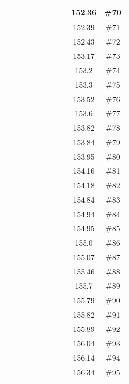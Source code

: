 \begin{center}
\begin{longtable}{|c|c|c|c|c|c|c|c|c|c|}
 \x &  \x &  &  &  &  \x &  \x &  & 152.36 & \#70 \\ \hline
 \x &  \x &  \x &  \x &  \x &  &  \x &  \x & 152.39 & \#71 \\ \hline
 \x &  &  &  \x &  \x &  \x &  &  \x & 152.43 & \#72 \\ \hline
 \x &  \x &  &  &  \x &  \x &  &  & 153.17 & \#73 \\ \hline
 \x &  \x &  \x &  &  &  &  \x &  & 153.2 & \#74 \\ \hline
 \x &  &  \x &  \x &  \x &  &  \x &  \x & 153.3 & \#75 \\ \hline
 \x &  &  \x &  \x &  &  &  \x &  & 153.52 & \#76 \\ \hline
 \x &  &  &  \x &  &  &  &  & 153.6 & \#77 \\ \hline
 \x &  \x &  \x &  &  &  \x &  \x &  & 153.82 & \#78 \\ \hline
 \x &  &  \x &  \x &  \x &  &  &  & 153.84 & \#79 \\ \hline
 \x &  &  &  &  \x &  \x &  &  & 153.95 & \#80 \\ \hline
 \x &  &  \x &  &  \x &  &  &  & 154.16 & \#81 \\ \hline
 \x &  \x &  &  \x &  &  &  &  & 154.18 & \#82 \\ \hline
 \x &  \x &  \x &  \x &  &  &  \x &  & 154.84 & \#83 \\ \hline
 \x &  &  &  \x &  \x &  \x &  \x &  \x & 154.94 & \#84 \\ \hline
 \x &  \x &  \x &  \x &  &  &  \x &  \x & 154.95 & \#85 \\ \hline
 \x &  \x &  &  \x &  &  &  \x &  & 155.0 & \#86 \\ \hline
 \x &  &  &  &  &  &  &  & 155.07 & \#87 \\ \hline
 \x &  \x &  \x &  &  \x &  &  \x &  & 155.46 & \#88 \\ \hline
 \x &  &  \x &  \x &  \x &  &  \x &  & 155.7 & \#89 \\ \hline
 \x &  \x &  \x &  \x &  \x &  &  &  \x & 155.79 & \#90 \\ \hline
 \x &  \x &  \x &  &  &  &  \x &  \x & 155.82 & \#91 \\ \hline
 \x &  &  \x &  \x &  &  &  \x &  \x & 155.89 & \#92 \\ \hline
 \x &  \x &  &  &  &  &  \x &  & 156.04 & \#93 \\ \hline
 \x &  &  &  \x &  &  \x &  &  \x & 156.14 & \#94 \\ \hline
 \x &  \x &  &  &  \x &  &  \x &  \x & 156.34 & \#95 \\ \hline

\end{longtable}
\end{center}

